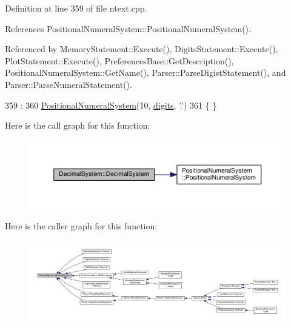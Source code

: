 Definition at line 359 of file ntext.\+cpp.



References Positional\+Numeral\+System\+::\+Positional\+Numeral\+System().



Referenced by Memory\+Statement\+::\+Execute(), Digits\+Statement\+::\+Execute(), Plot\+Statement\+::\+Execute(), Preferences\+Base\+::\+Get\+Description(), Positional\+Numeral\+System\+::\+Get\+Name(), Parser\+::\+Parse\+Digist\+Statement(), and Parser\+::\+Parse\+Numeral\+Statement().


\begin{DoxyCode}
359                                                 :
360     \hyperlink{classPositionalNumeralSystem_a923f36569ecc830f17bcf56dd2811754}{PositionalNumeralSystem}(10, \hyperlink{classPositionalNumeralSystem_a0a9e8e3f5d46e3c12dd3fc994ed2c1e6}{digits}, \textcolor{charliteral}{'.'})
361 \{ \}
\end{DoxyCode}


Here is the call graph for this function\+:\nopagebreak
\begin{figure}[H]
\begin{center}
\leavevmode
\includegraphics[width=350pt]{classDecimalSystem_a726d1a38079ae571c54adfbd0724a0a3_cgraph}
\end{center}
\end{figure}




Here is the caller graph for this function\+:\nopagebreak
\begin{figure}[H]
\begin{center}
\leavevmode
\includegraphics[width=350pt]{classDecimalSystem_a726d1a38079ae571c54adfbd0724a0a3_icgraph}
\end{center}
\end{figure}


